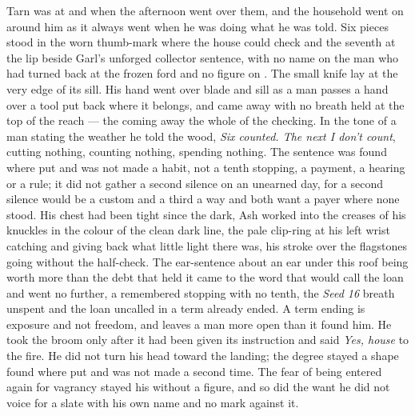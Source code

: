 Tarn was at  and  when the afternoon went over them, and the household went on around him as it always went when he was doing what he was told. Six pieces stood in the worn thumb-mark where the house could check and the seventh at the lip beside Garl's unforged collector sentence, with no name on the man who had turned back at the frozen ford and no figure on . The small knife lay at the very edge of its sill. His hand went over blade and sill as a man passes a hand over a tool put back where it belongs, and came away with no breath held at the top of the reach --- the coming away the whole of the checking. In the tone of a man stating the weather he told the wood, \emph{Six counted. The next I don't count}, cutting nothing, counting nothing, spending nothing. The sentence was found where put and was not made a habit, not a tenth stopping, a payment, a hearing or a rule; it did not gather a second silence on an unearned day, for a second silence would be a custom and a third a way and both want a payer where none stood. His chest had been tight since the dark, Ash worked into the creases of his knuckles in the colour of the clean dark line, the pale clip-ring at his left wrist catching and giving back what little light there was, his stroke over the flagstones going without the half-check. The ear-sentence about an ear under this roof being worth more than the debt that held it came to the word that would call the loan and went no further, a remembered stopping with no tenth, the \emph{Seed 16} breath unspent and the loan uncalled in a term already ended. A term ending is exposure and not freedom, and leaves a man more open than it found him. He took the broom only after it had been given its instruction and said \emph{Yes, house} to the fire. He did not turn his head toward the landing; the degree stayed a shape found where put and was not made a second time. The fear of being entered again for vagrancy stayed his without a figure, and so did the want he did not voice for a slate with his own name and no mark against it.

